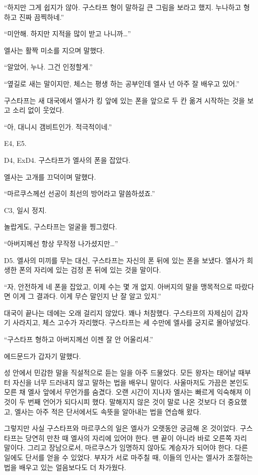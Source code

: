 ``하지만 그게 쉽지가 않아. 구스타프 형이 말하길 큰 그림을 보라고 했지. 누나하고 형하고 진짜 끔찍하네.''

``미안해. 하지만 지적을 많이 받고 나니까\ldots''

엘사는 활짝 미소를 지으며 말했다.

``알았어, 누나. 그건 인정할게.''

``옆길로 새는 말이지만, 체스는 평생 하는 공부인데 엘사 넌 아주 잘 배우고 있어.''

구스타프는 새 대국에서 엘사가 킹 앞에 있는 폰을 앞으로 두 칸 옮겨 시작하는 것을 보고 소리 없이 웃었다.

``아, 대니시 갬비트인가. 적극적이네.''

E4, E5.

D4, ExD4. 구스타프가 엘사의 폰을 잡았다.

엘사는 고개를 끄덕이며 말했다.

``마르쿠스께선 선공이 최선의 방어라고 말씀하셨죠.''

C3, 일시 정지.

놀랍게도, 구스타프는 얼굴을 찡그렸다.

``아버지께선 항상 무작정 나가셨지만\ldots''

D5. 엘사의 미끼를 무는 대신, 구스타프는 자신의 폰 뒤에 있는 폰을 보냈다. 엘사가 희생한 폰의 자리에 있는 검정 폰 뒤에 있는 것을 말이다.

``자, 안전하게 네 폰을 잡았고, 이제 수는 몇 개 없지. 아버지의 말을 맹목적으로 따랐다면 이게 그 결과다. 이게 무슨 말인지 난 잘 알고 있지.''

대국이 끝나는 데에는 오래 걸리지 않았다. 꽤나 처참했다. 구스타프의 자제심이 갑자기 사라지고, 체스 고수가 자리했다. 구스타프는 세 수만에 엘사를 궁지로 몰아넣었다.

``구스타프 형하고 아버지께선 이젠 잘 안 어울리셔.''

에드문드가 갑자기 말했다.

성 안에서 민감한 말을 직설적으로 듣는 일을 아주 드물었다. 모든 왕자는 태어날 때부터 자신을 너무 드러내지 않고 말하는 법을 배우니 말이다. 사울마저도 가끔은 본인도 모른 채 엘사 앞에서 무언가를 숨겼다. 오랜 시간이 지나자 엘사는 빠르게 익숙해져 이것이 두 번째 언어가 되다시피 했다. 말해지지 않은 것이 말로 나온 것보다 더 중요했고, 엘사는 아주 적은 단서에서도 속뜻을 알아내는 법을 연습해 왔다.

그렇지만 사실 구스타프와 마르쿠스의 일은 엘사가 오랫동안 궁금해 온 것이었다. 구스타프는 당연히 만찬 때 엘사의 자리에 있어야 한다. 맨 끝이 아니라 바로 오른쪽 자리 말이다. 그리고 장남으로서, 마르쿠스가 임명하지 않아도 계승자가 되어야 한다. 다른 일에도 단서를 얻을 수 있었다. 부자가 서로 마주칠 때, 이들의 인사는 엘사가 조절하는 법을 배우고 있는 얼음보다도 더 차가웠다.

